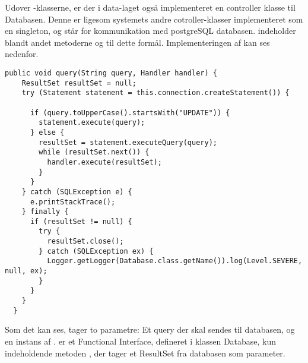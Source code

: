 \documentclass[../../main.tex]{subfiles}
\begin{document}
Udover -klasserne, er der i data-laget også implementeret en controller klasse til Databasen. Denne er ligesom systemets andre cotroller-klasser implementeret som en singleton, og står for kommunikation med postgreSQL databasen.  indeholder blandt andet metoderne og  til dette formål. Implementeringen af  kan ses nedenfor.


\begin{lstlisting}[caption=Database.query(),captionpos=b, label=Database.query()]
public void query(String query, Handler handler) {
    ResultSet resultSet = null;
    try (Statement statement = this.connection.createStatement()) {

      if (query.toUpperCase().startsWith("UPDATE")) {
        statement.execute(query);
      } else {
        resultSet = statement.executeQuery(query);
        while (resultSet.next()) {
          handler.execute(resultSet);
        }
      }
    } catch (SQLException e) {
      e.printStackTrace();
    } finally {
      if (resultSet != null) {
        try {
          resultSet.close();
        } catch (SQLException ex) {
          Logger.getLogger(Database.class.getName()).log(Level.SEVERE, null, ex);
        }
      }
    }
  }

\end{lstlisting}

Som det kan ses, tager  to parametre: Et query der skal sendes til databasen, og en instans af .  er et Functional Interface, defineret i klassen Database, kun indeholdende metoden , der tager et ResultSet fra databasen som parameter.
\end{document}
